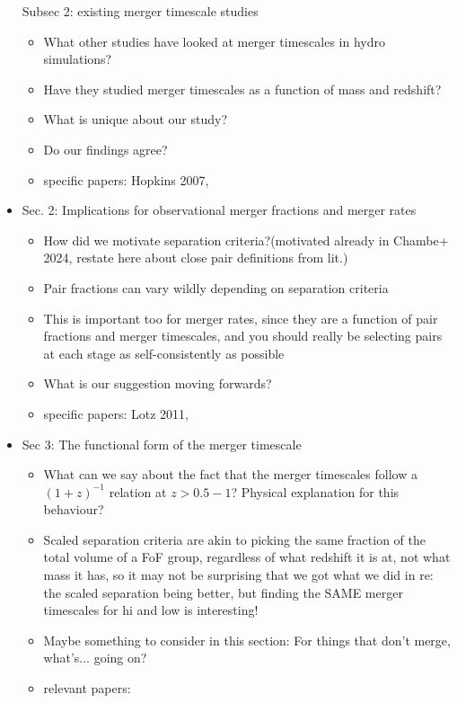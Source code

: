 \documentclass[twocolumn,linenumbers]{aastex631}
\begin{document}
\begin{itemize}
    Subsec 2: existing merger timescale studies
    \begin{itemize} 
        \item What other studies have looked at merger timescales in hydro simulations? 
        \item Have they studied merger timescales as a function of mass and redshift? 
        \item What is unique about our study?
        \item Do our findings agree? 
        \item specific papers: Hopkins 2007,
    \end{itemize}
    \item Sec. 2: Implications for observational merger fractions and merger rates
    \begin{itemize}
        \item How did we motivate separation criteria?(motivated already in Chambe+ 2024, restate here about close pair definitions from lit.)
        \item Pair fractions can vary wildly depending on separation criteria
        \item This is important too for merger rates, since they are a function of pair fractions and merger timescales, and you should really be selecting pairs at each stage as self-consistently as possible
        \item What is our suggestion moving forwards?
        \item specific papers: Lotz 2011, 
    \end{itemize}
    \item Sec 3: The functional form of the merger timescale
    \begin{itemize}
        \item What can we say about the fact that the merger timescales follow a $(1+z)^{-1}$ relation at $z>0.5-1$? Physical explanation for this behaviour? 
        \item Scaled separation criteria are akin to picking the same fraction of the total volume of a FoF group, regardless of what redshift it is at, not what mass it has, so it may not be surprising that we got what we did in re: the scaled separation being better, but finding the SAME merger timescales for hi and low is interesting!
        \item Maybe something to consider in this section: For things that don't merge, what's... going on? 
        \item relevant papers: 
    \end{itemize}
\end{itemize}
\end{document}
